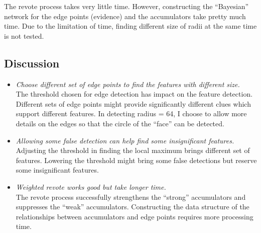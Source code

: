 \documentclass[paper=a4, fontsize=11pt]{scrartcl}
\begin{document}
The revote process takes very little time. 
However, constructing the ``Bayesian'' network for the edge points (evidence) and the accumulators take pretty much time.
Due to the limitation of time, finding different size of radii at the same time is not tested.

\subsection{Discussion}

\begin{itemize}
\item \emph{ Choose different set of edge points to find the features with different size. } \\
The threshold chosen for edge detection has impact on the feature detection. 
Different sets of edge points might provide significantly different clues which support different features.
In detecting radius = 64, I choose to allow more details on the edges so that the circle of the ``face'' can be detected.
\item \emph{Allowing some false detection can help find some insignificant features.} \\
Adjusting the threshold in finding the local maximum brings different set of features.
Lowering the threshold might bring some false detections but reserve some insignificant features.
\item \emph{ Weighted revote works good but take longer time. } \\
The revote process successfully strengthens the ``strong'' accumulators and suppresses the ``weak'' accumulators.
Constructing the data structure of the relationships between accumulators and edge points requires more processing time.
\end{itemize}
\end{document}
